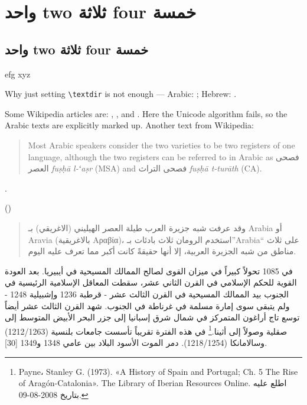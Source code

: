 \documentclass{book}
\begin{document}
\tableofcontents

\chapter{واحد two ثلاثة four خمسة}

\section{واحد two ثلاثة four خمسة}

efg 
 xyz

Why just setting \verb|\textdir| is not enough — Arabic: ;
Hebrew: .

Some Wikipedia articles are: ,
, and . Here the Unicode algorithm
fails, so the Arabic texts are explicitly marked up. Another text from 
Wikipedia:
\begin{quotation}\small
  Most Arabic speakers consider the two varieties to be two registers
  of one language, although the two registers can be referred to in
  Arabic as فصحى العصر \textit{fuṣḥā l-ʻaṣr} (MSA) and
  فصحى التراث \textit{fuṣḥā t-turāth} (CA).
\end{quotation}

.


()


\begin{quotation}\small
وقد عرفت شبه جزيرة العرب طيلة العصر الهيليني
(الاغريقي) بـ Arabia أو Aravia (بالاغريقية Αραβία)،
استخدم الرومان ثلاث بادئات بـ”Arabia“ على ثلاث
مناطق من شبه الجزيرة العربية، إلا أنها حقيقةً
كانت أكبر مما تعرف عليه اليوم. 
\end{quotation}

في 1085 تحولاً كبيراً في ميزان القوى لصالح الممالك المسيحية في
أيبيريا. بعد العودة القوية للحكم الإسلامي في القرن الثاني عشر، سقطت
المعاقل الإسلامية الرئيسية في الجنوب بيد الممالك المسيحية في القرن
الثالث عشر - قرطبة 1236 وإشبيلية 1248 - ولم يتبقى سوى إمارة مسلمة في
غرناطة في الجنوب. شهد القرن الثالث عشر أيضاً توسع تاج أراغون المتمركز
في شمال شرق إسبانيا إلى جزر البحر الأبيض المتوسط إلى صقلية وصولاً إلى
أثينا.\footnote{Payne، Stanley G. (1973). «A History of Spain and
Portugal; Ch. 5 The Rise of Aragón-Catalonia». The Library of Iberian
Resources Online. اطلع عليه بتاريخ 2008-08-09.} في هذه الفترة تقريباً
تأسست جامعات بلنسية (1212/1263) وسالامانكا (1218/1254). دمر الموت
الأسود البلاد بين عامي 1348 و1349 [30].
\end{document}
